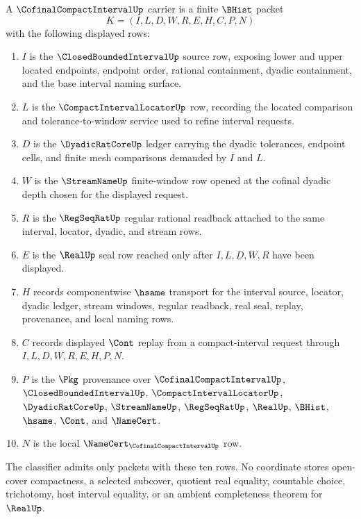 \begin{definition}
\label{def:cofinal-compact-interval-carrier}
A $\CofinalCompactIntervalUp$ carrier is a finite $\BHist$ packet
$$
K=(I,L,D,W,R,E,H,C,P,N)
$$
with the following displayed rows:
\begin{enumerate}
\item $I$ is the $\ClosedBoundedIntervalUp$ source row, exposing lower and upper located endpoints, endpoint order, rational containment, dyadic containment, and the base interval naming surface.
\item $L$ is the $\CompactIntervalLocatorUp$ row, recording the located comparison and tolerance-to-window service used to refine interval requests.
\item $D$ is the $\DyadicRatCoreUp$ ledger carrying the dyadic tolerances, endpoint cells, and finite mesh comparisons demanded by $I$ and $L$.
\item $W$ is the $\StreamNameUp$ finite-window row opened at the cofinal dyadic depth chosen for the displayed request.
\item $R$ is the $\RegSeqRatUp$ regular rational readback attached to the same interval, locator, dyadic, and stream rows.
\item $E$ is the $\RealUp$ seal row reached only after $I,L,D,W,R$ have been displayed.
\item $H$ records componentwise $\hsame$ transport for the interval source, locator, dyadic ledger, stream windows, regular readback, real seal, replay, provenance, and local naming rows.
\item $C$ records displayed $\Cont$ replay from a compact-interval request through $I,L,D,W,R,E,H,P,N$.
\item $P$ is the $\Pkg$ provenance over $\CofinalCompactIntervalUp$, $\ClosedBoundedIntervalUp$, $\CompactIntervalLocatorUp$, $\DyadicRatCoreUp$, $\StreamNameUp$, $\RegSeqRatUp$, $\RealUp$, $\BHist$, $\hsame$, $\Cont$, and $\NameCert$.
\item $N$ is the local $\NameCert_{\CofinalCompactIntervalUp}$ row.
\end{enumerate}
The classifier admits only packets with these ten rows. No coordinate stores open-cover compactness, a selected subcover, quotient real equality, countable choice, trichotomy, host interval equality, or an ambient completeness theorem for $\RealUp$.
\end{definition}

